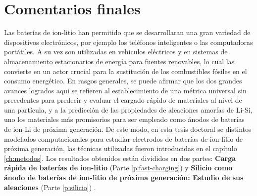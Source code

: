 \chapter{Comentarios finales}\label{ch:comentarios}

Las baterías de ion-litio han permitido que se desarrollaran una gran variedad de
dispositivos electrónicos, por ejemplo los teléfonos inteligentes o las 
computadoras portátiles. A su vez son utilizadas en vehículos eléctricos y en 
sistemas de almacenamiento estacionarios de energía para fuentes
renovables, lo cual las convierte en un actor crucial para la sustitución de 
los combustibles fósiles en el consumo energético. En rasgos generales, se puede
afirmar que los dos grandes avances logrados aquí se refieren al establecimiento
de una métrica universal sin precedentes para predecir y evaluar el cargado rápido
de materiales al nivel de una partícula, y a la predicción de las propiedades de 
aleaciones amorfas de Li-Si, uno los materiales más promisorios para ser empleado 
como ánodos de baterías de ion-Li de próxima generación. De este modo, en esta 
tesis doctoral se 
 distintos modelados computacionales para estudiar electrodos de 
baterías de ion-litio de próxima generación, las técnicas utilizadas fueron 
introducidas en el capítulo \ref{ch:metodos}. Los resultados obtenidos están 
divididos en dos partes: \textbf{Carga rápida de baterías de ion-litio} (Parte 
\ref{p:fast-charging}) \cite{fernandez2023towards} y \textbf{Silicio como ánodo
de baterías de ion-litio de próxima generación: Estudio de sus aleaciones} (Parte 
\ref{p:silicio}) \cite{fernandez2023nmr, oviedo2023, fernandez2021characterization}.

